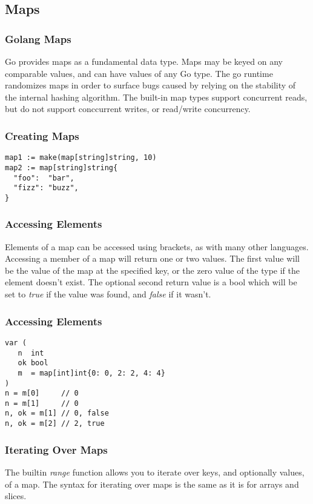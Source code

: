 \documentclass{beamer}
\begin{document}
\subsection{Maps}

\begin{frame}
  \frametitle{Golang Maps}
  Go provides maps as a fundamental data type.  Maps may be keyed on
  any comparable values, and can have values of any Go type.  The go
  runtime randomizes maps in order to surface bugs caused by relying
  on the stability of the internal hashing algorithm.  The built-in
  map types support concurrent reads, but do not support conccurrent
  writes, or read/write concurrency.
\end{frame}

\begin{frame}[fragile]
  \frametitle{Creating Maps}
\begin{lstlisting}[language=Golang]
map1 := make(map[string]string, 10)
map2 := map[string]string{
  "foo":  "bar",
  "fizz": "buzz",
}
\end{lstlisting}
\end{frame}

\begin{frame}
  \frametitle{Accessing Elements}
  Elements of a map can be accessed using brackets, as with many other
  languages.  Accessing a member of a map will return one or two
  values.  The first value will be the value of the map at the
  specified key, or the zero value of the type if the element doesn't
  exist.  The optional second return value is a bool which will be set
  to \emph{true} if the value was found, and \emph{false} if it
  wasn't.
\end{frame}

\begin{frame}[fragile]
  \frametitle{Accessing Elements}
\begin{lstlisting}[language=Golang]
var (
   n  int
   ok bool
   m  = map[int]int{0: 0, 2: 2, 4: 4}
)
n = m[0]     // 0
n = m[1]     // 0
n, ok = m[1] // 0, false
n, ok = m[2] // 2, true
\end{lstlisting}
\end{frame}

\begin{frame}
  \frametitle{Iterating Over Maps}
  The builtin \emph{range} function allows you to iterate over keys,
  and optionally values, of a map.  The syntax for iterating over maps
  is the same as it is for arrays and slices.
\end{frame}
\end{document}
